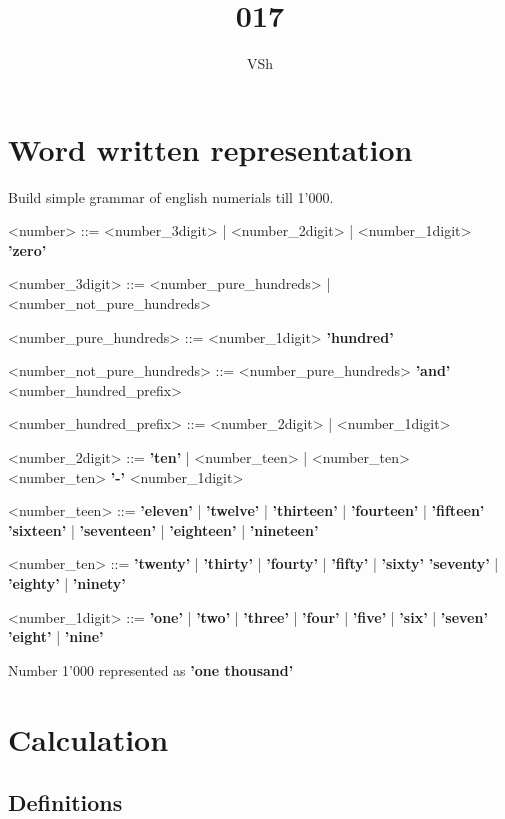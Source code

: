 \documentclass{article}
\begin{document}
\title{017}
\author{VSh}

\maketitle

\section{Word written representation}
Build simple grammar of english numerials till 1'000.

\setlength{\grammarindent}{10em}
\begin{grammar}
    <number> ::= <number_3digit> | <number_2digit> | <number_1digit>
    \alt \textbf{'zero'}

    <number_3digit> ::= <number_pure_hundreds> | <number_not_pure_hundreds>

    <number_pure_hundreds> ::= <number_1digit> \textbf{'hundred'}

    <number_not_pure_hundreds> ::= <number_pure_hundreds> \textbf{'and'} <number_hundred_prefix>

    <number_hundred_prefix> ::= <number_2digit> | <number_1digit>

    <number_2digit> ::= \textbf{'ten'} | <number_teen> | <number_ten>
    \alt <number_ten> \textbf{'-'} <number_1digit>

    <number_teen> ::= \textbf{'eleven'} | \textbf{'twelve'} | \textbf{'thirteen'}
    | \textbf{'fourteen'} | \textbf{'fifteen'} \alt
    \textbf{'sixteen'} |  \textbf{'seventeen'} | \textbf{'eighteen'}
    | \textbf{'nineteen'}

    <number_ten> ::= \textbf{'twenty'} | \textbf{'thirty'} | \textbf{'fourty'}
    | \textbf{'fifty'} | \textbf{'sixty'} \alt \textbf{'seventy'}
    | \textbf{'eighty'} | \textbf{'ninety'}

    <number_1digit> ::= \textbf{'one'} | \textbf{'two'} | \textbf{'three'} | \textbf{'four'}
    | \textbf{'five'} | \textbf{'six'} | \textbf{'seven'}
    \alt \textbf{'eight'} | \textbf{'nine'}

\end{grammar}
Number 1'000 represented as \textbf{'one thousand'}

\section{Calculation}
\subsection{Definitions}
\end{document}
